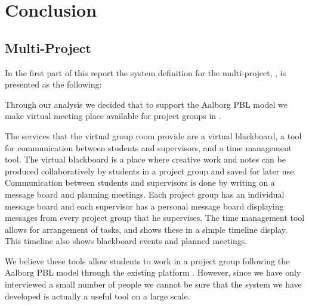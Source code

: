 \chapter{Conclusion}
\label{chap:conclusion}
\section{Multi-Project}
\label{sec:multiconclusion}
In the first part of this report the system definition for the multi-project, \system{}, is presented as the following: 



Through our analysis we decided that to support the Aalborg PBL model we make virtual meeting place available for project groups in \moodle{}.

The services that the virtual group room provide are a virtual blackboard, a tool for communication between students and supervisors, and a time management tool.
The virtual blackboard is a place where creative work and notes can be produced collaboratively by students in a project group and saved for later use.
Communication between students and supervisors is done by writing on a message board and planning meetings.
Each project group has an individual message board and each supervisor has a personal message board displaying messages from every project group that he supervises.
The time management tool allows for arrangement of tasks, and shows these in a simple timeline display.
This timeline also shows blackboard events and planned meetings.


We believe these tools allow students to work in a project group following the Aalborg PBL model through the existing platform \moodle{}.
However, since we have only interviewed a small number of people we cannot be sure that the system we have developed is actually a useful tool on a large scale. %


